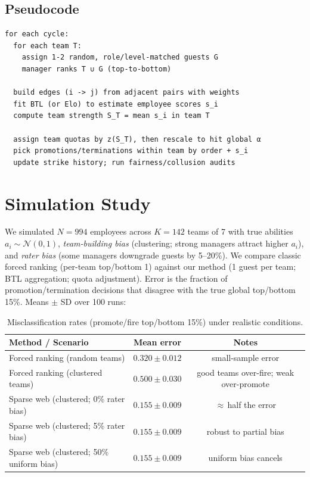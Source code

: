 \documentclass[11pt]{article}
\begin{document}
\subsection{Pseudocode}
\begin{lstlisting}[basicstyle=\ttfamily\small,frame=single]
for each cycle:
  for each team T:
    assign 1-2 random, role/level-matched guests G
    manager ranks T ∪ G (top-to-bottom)

  build edges (i -> j) from adjacent pairs with weights
  fit BTL (or Elo) to estimate employee scores s_i
  compute team strength S_T = mean s_i in team T

  assign team quotas by z(S_T), then rescale to hit global α
  pick promotions/terminations within team by order + s_i
  update strike history; run fairness/collusion audits
\end{lstlisting}

\section{Simulation Study}
We simulated $N{=}994$ employees across $K{=}142$ teams of 7 with true abilities $a_i \sim \mathcal{N}(0,1)$, \emph{team-building bias} (clustering; strong managers attract higher $a_i$), and \emph{rater bias} (some managers downgrade guests by 5--20\%). We compare classic forced ranking (per-team top/bottom 1) against our method (1 guest per team; BTL aggregation; quota adjustment). Error is the fraction of promotion/termination decisions that disagree with the true global top/bottom 15\%. Means $\pm$ SD over 100 runs:

\begin{table}[h]
\centering
\begin{tabular}{lcc}
\toprule
\textbf{Method / Scenario} & \textbf{Mean error} & \textbf{Notes}\\
\midrule
Forced ranking (random teams) & $0.320 \pm 0.012$ & small-sample error\\
Forced ranking (clustered teams) & $0.500 \pm 0.030$ & good teams over-fire; weak over-promote\\
Sparse web (clustered; 0\% rater bias) & $\mathbf{0.155} \pm 0.009$ & $\approx$\,half the error\\
Sparse web (clustered; 5\% rater bias) & $0.155 \pm 0.009$ & robust to partial bias\\
Sparse web (clustered; 50\% uniform bias) & $0.155 \pm 0.009$ & uniform bias cancels\\
\bottomrule
\end{tabular}
\caption{Misclassification rates (promote/fire top/bottom 15\%) under realistic conditions.}
\label{tab:results}
\end{table}
\end{document}
